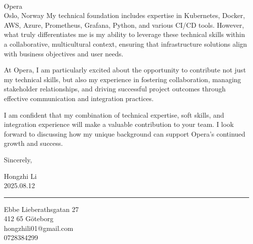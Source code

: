 \documentclass[a4paper,10pt]{article}
\begin{document}
\begin{letter}{\color{darkblue}\\
Opera\\
Oslo, Norway}
My technical foundation includes expertise in Kubernetes, Docker, AWS, Azure, Prometheus, Grafana, Python, and various CI/CD tools. However, what truly differentiates me is my ability to leverage these technical skills within a collaborative, multicultural context, ensuring that infrastructure solutions align with business objectives and user needs.

At Opera, I am particularly excited about the opportunity to contribute not just my technical skills, but also my experience in fostering collaboration, managing stakeholder relationships, and driving successful project outcomes through effective communication and integration practices.

I am confident that my combination of technical expertise, soft skills, and integration experience will make a valuable contribution to your team. I look forward to discussing how my unique background can support Opera's continued growth and success.

\vspace{20pt}

Sincerely,

Hongzhi Li\\
2025.08.12

\vspace{40pt}

{\color{darkblue}\rule{\linewidth}{0.6pt}}

\vspace{4pt}

\closing{\color{darkblue} 
Ebbe Lieberathsgatan 27\\
412 65 Göteborg\\
hongzhili01@gmail.com\\
0728384299}

\\
\vspace{10pt}

\end{letter}
\end{document}
